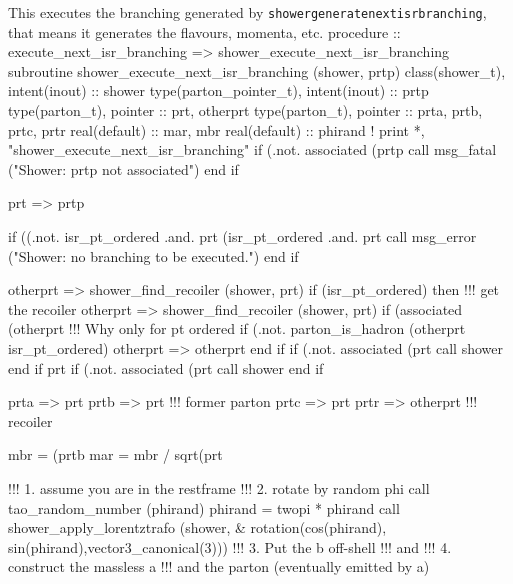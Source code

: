\eatline
\nwendcode{}This executes the branching generated by
{\tt{}shower{}generate{}next{}isr{}branching}, that means it generates the
flavours, momenta, etc.
\nwenddocs{}\plusendmoddef
  procedure :: execute_next_isr_branching => shower_execute_next_isr_branching
\nwendcode{}\plusendmoddef
  subroutine shower_execute_next_isr_branching (shower, prtp)
    class(shower_t), intent(inout) :: shower
    type(parton_pointer_t), intent(inout) :: prtp
    type(parton_t), pointer :: prt, otherprt
    type(parton_t), pointer :: prta, prtb, prtc, prtr
    real(default) :: mar, mbr
    real(default) :: phirand
    ! print *, "shower_execute_next_isr_branching"
    if (.not. associated (prtp%
       call msg_fatal ("Shower: prtp not associated")
    end if

    prt => prtp%

    if ((.not. isr_pt_ordered .and. prt%
         (isr_pt_ordered .and. prt%
       call msg_error ("Shower: no branching to be executed.")
    end if

    otherprt => shower_find_recoiler (shower, prt)
    if (isr_pt_ordered) then
       !!! get the recoiler
       otherprt => shower_find_recoiler (shower, prt)
       if (associated (otherprt%
          !!! Why only for pt ordered
          if (.not. parton_is_hadron (otherprt%
               isr_pt_ordered) otherprt => otherprt%
       end if
       if (.not. associated (prt%
          call shower%
       end if
       prt%
       if (.not. associated (prt%
          call shower%
       end if

       prta => prt%
       prtb => prt                 !!! former parton
       prtc => prt%
       prtr => otherprt            !!! recoiler

       mbr = (prtb%
       mar = mbr / sqrt(prt%

       !!! 1. assume you are in the restframe
       !!! 2. rotate by random phi
       call tao_random_number (phirand)
       phirand = twopi * phirand
       call shower_apply_lorentztrafo (shower, &
            rotation(cos(phirand), sin(phirand),vector3_canonical(3)))
       !!! 3. Put the b off-shell
       !!! and
       !!! 4. construct the massless a
       !!! and the parton (eventually emitted by a)

